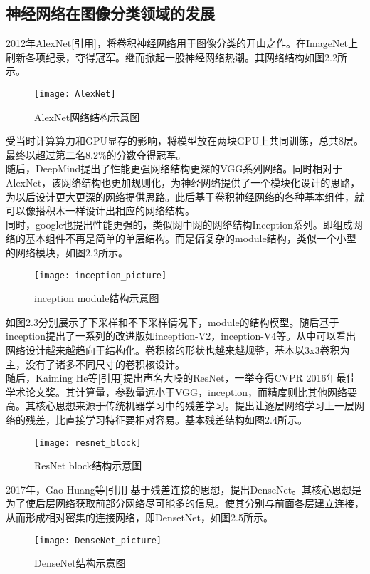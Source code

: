 \subsection{神经网络在图像分类领域的发展}
2012年AlexNet[引用]，将卷积神经网络用于图像分类的开山之作。在ImageNet上刷新各项纪录，夺得冠军。继而掀起一股神经网络热潮。其网络结构如图2.2所示。\\
\begin{figure}[htp]
\centering
\texttt{[image: AlexNet]}
\caption{AlexNet网络结构示意图}
\end{figure}
受当时计算算力和GPU显存的影响，将模型放在两块GPU上共同训练，总共8层。最终以超过第二名8.2\%的分数夺得冠军。\\
随后，DeepMind提出了性能更强网络结构更深的VGG系列网络。同时相对于AlexNet，该网络结构也更加规则化，为神经网络提供了一个模块化设计的思路，为以后设计更大更深的网络提供思路。此后基于卷积神经网络的各种基本组件，就可以像搭积木一样设计出相应的网络结构。\\
同时，google也提出性能更强的，类似网中网的网络结构Inception系列。即组成网络的基本组件不再是简单的单层结构。而是偏复杂的module结构，类似一个小型的网络模块，如图2.2所示。\\
\begin{figure}[htp]
\centering
\texttt{[image: inception\_picture]}
\caption{inception module结构示意图}
\end{figure}
如图2.3分别展示了下采样和不下采样情况下，module的结构模型。随后基于inception提出了一系列的改进版如inception-V2，inception-V4等。从中可以看出网络设计越来越趋向于结构化。卷积核的形状也越来越规整，基本以3x3卷积为主，没有了诸多不同尺寸的卷积核设计。\\
随后，Kaiming He等[引用]提出声名大噪的ResNet，一举夺得CVPR 2016年最佳学术论文奖。其计算量，参数量远小于VGG，inception，而精度则比其他网络要高。其核心思想来源于传统机器学习中的残差学习。提出让逐层网络学习上一层网络的残差，比直接学习特征要相对容易。基本残差结构如图2.4所示。
\begin{figure}[htp]
\centering
\texttt{[image: resnet\_block]}
\caption{ResNet block结构示意图}
\end{figure}
2017年，Gao Huang等[引用]基于残差连接的思想，提出DenseNet。其核心思想是为了使后层网络获取前部分网络尽可能多的信息。使其分别与前面各层建立连接，从而形成相对密集的连接网络，即DensetNet，如图2.5所示。\\
\begin{figure}[htp]
\centering
\texttt{[image: DenseNet\_picture]}
\caption{DenseNet结构示意图}
\end{figure}
